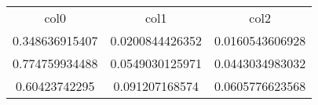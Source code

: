 \begin{table}
\begin{tabular}{ccc}
col0 & col1 & col2 \\
0.348636915407 & 0.0200844426352 & 0.0160543606928 \\
0.774759934488 & 0.0549030125971 & 0.0443034983032 \\
0.60423742295 & 0.091207168574 & 0.0605776623568 \\
\end{tabular}
\end{table}
